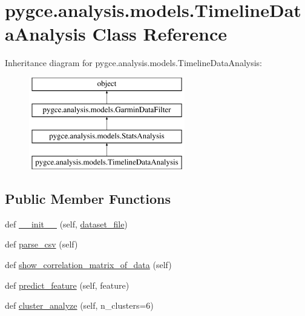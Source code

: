 \hypertarget{classpygce_1_1analysis_1_1models_1_1_timeline_data_analysis}{}\section{pygce.\+analysis.\+models.\+Timeline\+Data\+Analysis Class Reference}
\label{classpygce_1_1analysis_1_1models_1_1_timeline_data_analysis}
Inheritance diagram for pygce.\+analysis.\+models.\+Timeline\+Data\+Analysis\+:\begin{figure}[H]
\begin{center}
\leavevmode
\includegraphics[height=4.000000cm]{classpygce_1_1analysis_1_1models_1_1_timeline_data_analysis}
\end{center}
\end{figure}
\subsection*{Public Member Functions}
\begin{DoxyCompactItemize}
\item 
def \hyperlink{classpygce_1_1analysis_1_1models_1_1_timeline_data_analysis_a7fccb7531cafe3b618ad7026db2d3b53}{\+\_\+\+\_\+init\+\_\+\+\_\+} (self, \hyperlink{classpygce_1_1analysis_1_1models_1_1_garmin_data_filter_a7bb7be05577c2d31546e27823a5d11c5}{dataset\+\_\+file})
\item 
def \hyperlink{classpygce_1_1analysis_1_1models_1_1_timeline_data_analysis_a1a02ca1184152091fc1f66306e1ac02c}{parse\+\_\+csv} (self)
\item 
def \hyperlink{classpygce_1_1analysis_1_1models_1_1_timeline_data_analysis_ac5f4540c89ea52ccbd5c28ce850bc1d3}{show\+\_\+correlation\+\_\+matrix\+\_\+of\+\_\+data} (self)
\item 
def \hyperlink{classpygce_1_1analysis_1_1models_1_1_timeline_data_analysis_ab769c6f075333081a68712e0ecf8b094}{predict\+\_\+feature} (self, feature)
\item 
def \hyperlink{classpygce_1_1analysis_1_1models_1_1_timeline_data_analysis_a4bdbc9b67a365b2e0d5a76e7bd811ce5}{cluster\+\_\+analyze} (self, n\+\_\+clusters=6)
\end{DoxyCompactItemize}
